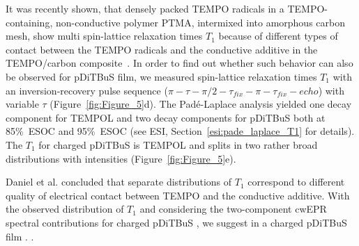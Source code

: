 It was recently shown, that densely packed TEMPO radicals in a TEMPO-containing, non-conductive polymer PTMA, intermixed into  amorphous carbon mesh, show multi spin-lattice relaxation times $T_1$ because of different types of contact between the TEMPO radicals and the conductive additive in the TEMPO/carbon composite~\cite{Daniel2023}. In order to find out whether such behavior can also be observed for  pDiTBuS film, we measured spin-lattice relaxation times $T_1$ with an inversion-recovery pulse sequence ($\pi-\tau-\pi/2-\tau_{fix}-\pi-\tau_{fix}-echo$) with variable $\tau$ (Figure~\ref{fig:Figure_5}d). The Pad{\'e}-Laplace analysis yielded one decay component for TEMPOL and two decay components for pDiTBuS both at 85\%~ESOC and 95\%~ESOC (see ESI, Section~\ref{esi:pade_laplace_T1} for details). The $T_1$ for charged pDiTBuS is TEMPOL and splits in two rather broad distributions with  intensities (Figure~\ref{fig:Figure_5}e).  

Daniel et al. concluded that separate distributions of $T_1$ correspond to different  quality of electrical contact between TEMPO and the conductive additive. With the observed distribution of $T_1$ and considering the two-component cwEPR spectral contributions for charged pDiTBuS , we suggest  in a  charged pDiTBuS film  .  .\\%

